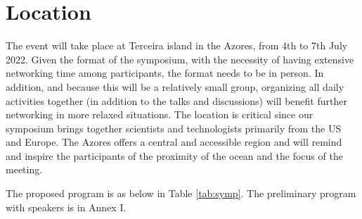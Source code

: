 \section{Location}

The event will take place at Terceira island in the Azores, from 4th to
7th July 2022. Given the format of the symposium, with the necessity of
having extensive networking time among participants, the format needs to
be in person. In addition, and because this will be a relatively small
group, organizing all daily activities together (in addition to the
talks and discussions) will benefit further networking in more relaxed
situations. The location is critical since our symposium brings together
scientists and technologists primarily from the US and Europe. The
Azores offers a central and accessible region and will remind and
inspire the participants of the proximity of the ocean and the focus of
the meeting.

The proposed program is as below in Table \ref{tab:symp}. The preliminary program with speakers is in Annex I.

